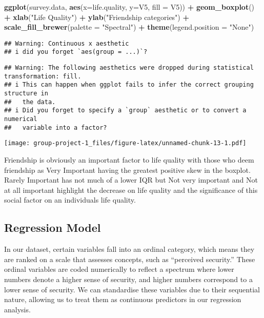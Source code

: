 \documentclass[
]{article}
\newenvironment{Shaded}{\begin{snugshade}}{\end{snugshade}}
\newcommand{\AttributeTok}[1]{\textcolor[rgb]{0.13,0.29,0.53}{#1}}
\newcommand{\FunctionTok}[1]{\textcolor[rgb]{0.13,0.29,0.53}{\textbf{#1}}}
\newcommand{\NormalTok}[1]{#1}
\newcommand{\SpecialCharTok}[1]{\textcolor[rgb]{0.81,0.36,0.00}{\textbf{#1}}}
\newcommand{\StringTok}[1]{\textcolor[rgb]{0.31,0.60,0.02}{#1}}
\begin{document}
\begin{Shaded}
\begin{Highlighting}[]
\FunctionTok{ggplot}\NormalTok{(survey.data, }\FunctionTok{aes}\NormalTok{(}\AttributeTok{x=}\NormalTok{life.quality, }\AttributeTok{y=}\NormalTok{V5, }\AttributeTok{fill =}\NormalTok{ V5)) }\SpecialCharTok{+} 
  \FunctionTok{geom\_boxplot}\NormalTok{() }\SpecialCharTok{+}
  \FunctionTok{xlab}\NormalTok{(}\StringTok{"Life Quality"}\NormalTok{) }\SpecialCharTok{+}
  \FunctionTok{ylab}\NormalTok{(}\StringTok{"Friendship categories"}\NormalTok{) }\SpecialCharTok{+}
  \FunctionTok{scale\_fill\_brewer}\NormalTok{(}\AttributeTok{palette =} \StringTok{"Spectral"}\NormalTok{) }\SpecialCharTok{+}
  \FunctionTok{theme}\NormalTok{(}\AttributeTok{legend.position =} \StringTok{"None"}\NormalTok{)}
\end{Highlighting}
\end{Shaded}

\begin{verbatim}
## Warning: Continuous x aesthetic
## i did you forget `aes(group = ...)`?
\end{verbatim}

\begin{verbatim}
## Warning: The following aesthetics were dropped during statistical transformation: fill.
## i This can happen when ggplot fails to infer the correct grouping structure in
##   the data.
## i Did you forget to specify a `group` aesthetic or to convert a numerical
##   variable into a factor?
\end{verbatim}

\texttt{[image: group-project-1\_files/figure-latex/unnamed-chunk-13-1.pdf]}

Friendship is obviously an important factor to life quality with those
who deem friendship as Very Important having the greatest positive skew
in the boxplot. Rarely Important has not much of a lower IQR but Not
very important and Not at all important highlight the decrease on life
quality and the significance of this social factor on an individuals
life quality.

\hypertarget{regression-model}{%
\subsection{Regression Model}\label{regression-model}}

In our dataset, certain variables fall into an ordinal category, which
means they are ranked on a scale that assesses concepts, such as
``perceived security.'' These ordinal variables are coded numerically to
reflect a spectrum where lower numbers denote a higher sense of
security, and higher numbers correspond to a lower sense of security. We
can standardise these variables due to their sequential nature, allowing
us to treat them as continuous predictors in our regression analysis.
\end{document}
